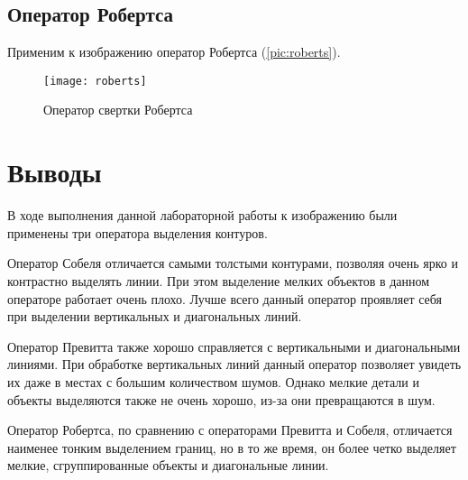 \subsection{Оператор Робертса}

Применим к изображению оператор Робертса (\vref{pic:roberts}).

\begin{figure}[H]
	\centering
	\texttt{[image: roberts]}
	\caption{Оператор свертки Робертса}
	\label{pic:roberts}
\end{figure}

\section{Выводы}

В ходе выполнения данной лабораторной работы к изображению были применены три оператора выделения контуров.

Оператор Собеля отличается самыми толстыми контурами, позволяя очень ярко и контрастно выделять линии. При этом выделение мелких объектов в данном операторе работает очень плохо. Лучше всего данный оператор проявляет себя при выделении вертикальных и диагональных линий.

Оператор Превитта также хорошо справляется с вертикальными и диагональными линиями. При обработке вертикальных линий данный оператор позволяет увидеть их даже в местах с большим количеством шумов. Однако мелкие детали и объекты выделяются также не очень хорошо, из-за они превращаются в шум. 

Оператор Робертса, по сравнению с операторами Превитта и Собеля, отличается наименее тонким выделением границ, но в то же время, он более четко выделяет мелкие, сгруппированные объекты и диагональные линии.